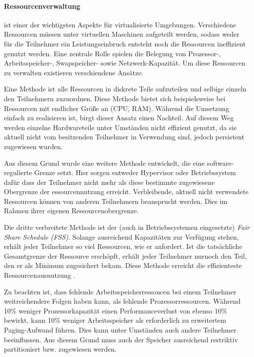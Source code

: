 \paragraph{Ressourcenverwaltung} ist einer der wichtigsten Aspekte für virtualisierte Umgebungen.
Verschiedene Ressourcen müssen unter virtuellen Maschinen aufgeteilt werden, sodass weder für die
Teilnehmer ein Leistungseinbruch entsteht noch die Ressourcen ineffizient genutzt werden.
Eine zentrale Rolle spielen die Belegung von Prozessor-, Arbeitsspeicher-,
Swapspeicher- sowie Netzwerk-Kapazität. Um diese Ressourcen zu verwalten existieren verschiendene
Ansätze.

Eine Methode ist alle Ressourcen in diskrete Teile aufzuteilen und selbige einzeln den Teilnehmern
zuzuordnen. Diese Methode bietet sich beispielsweise bei Ressourcen mit endlicher Größe an
(CPU, RAM). Während die Umsetzung einfach zu realisieren ist, birgt dieser Ansatz einen Nachteil.
Auf diesem Weg werden einzelne Hardwareteile unter Umständen nicht effizient genutzt,
da sie aktuell nicht vom besitzenden Teilnehmer in Verwendung sind, jedoch persistent zugewiesen wurden.

Aus diesem Grund wurde eine weitere Methode entwickelt, die eine software-regulierte Grenze setzt.
Hier sorgen entweder Hypervisor oder Betriebssystem dafür dass der Teilnehmer nicht mehr als
diese bestimmte zugewiesene Obergrenze der essourcennutzung erreicht. Verbleibende, aktuell
nicht verwendete Ressourcen können von anderen Teilnehmern beansprucht werden. Dies im Rahmen
ihrer eigenen Ressourcenobergrenze\cite{victor10}.

Die dritte verbreitete Methode ist der (auch in Betriebssystemen eingesetzte)
\textit{Fair Share Schedule (FSS)}. Solange ausreichend Kapazitäten zur Verfügung stehen,
erhält jeder Teilnehmer so viel Ressourcen, wie er anfordert. Ist die tatsächliche Gesamtgrenze der
Ressource erschöpft, erhält jeder Teilnehmer nurnoch den Teil, den er als Minimum zugesichert bekam.
Diese Methode erreicht die effizienteste Ressourcenausnutzung \cite{victor10}.

Zu beachten ist, dass fehlende Arbeitsspeicherressoucen bei einem Teilnehmer weitreichendere Folgen
haben kann, als fehlende Prozessorressourcen. Während 10\% weniger Prozessorkapazität einen
Performanceverlust von ebenso 10\% bewirkt, kann 10\% weniger Arbeitsspeicher als erforderlich zu
erweitertem Paging-Aufwand führen. Dies kann unter Umständen auch andere Teilnehmer beeinflussen.
Aus diesem Grund muss auch der Speicher ausreichend restriktiv partitioniert bzw. zugewiesen werden.

